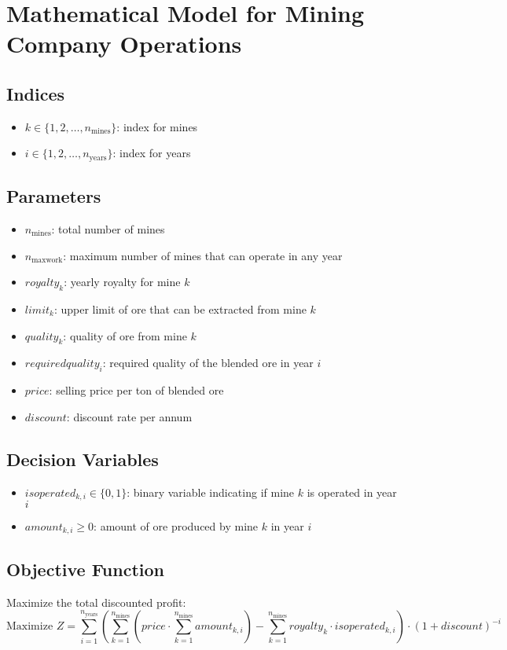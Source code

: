 \documentclass{article}
\begin{document}
\section*{Mathematical Model for Mining Company Operations}

\subsection*{Indices}
\begin{itemize}
    \item $k \in \{1, 2, \ldots, n_{\text{mines}}\}$: index for mines
    \item $i \in \{1, 2, \ldots, n_{\text{years}}\}$: index for years
\end{itemize}

\subsection*{Parameters}
\begin{itemize}
    \item $n_{\text{mines}}$: total number of mines
    \item $n_{\text{maxwork}}$: maximum number of mines that can operate in any year
    \item $royalty_k$: yearly royalty for mine $k$
    \item $limit_k$: upper limit of ore that can be extracted from mine $k$
    \item $quality_k$: quality of ore from mine $k$
    \item $requiredquality_i$: required quality of the blended ore in year $i$
    \item $price$: selling price per ton of blended ore
    \item $discount$: discount rate per annum
\end{itemize}

\subsection*{Decision Variables}
\begin{itemize}
    \item $isoperated_{k,i} \in \{0, 1\}$: binary variable indicating if mine $k$ is operated in year $i$
    \item $amount_{k,i} \geq 0$: amount of ore produced by mine $k$ in year $i$
\end{itemize}

\subsection*{Objective Function}
Maximize the total discounted profit:
\[
\text{Maximize } Z = \sum_{i=1}^{n_{\text{years}}} \left( \sum_{k=1}^{n_{\text{mines}}} (price \cdot \sum_{k=1}^{n_{\text{mines}}} amount_{k,i}) - \sum_{k=1}^{n_{\text{mines}}} royalty_k \cdot isoperated_{k,i} \right) \cdot (1 + discount)^{-i}
\]
\end{document}
